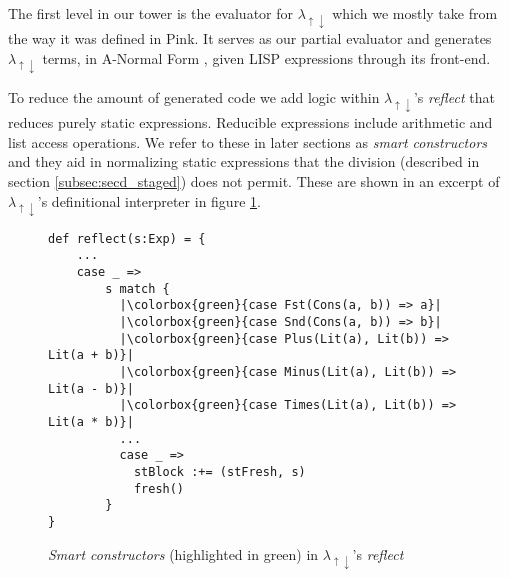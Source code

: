 \documentclass[a4paper,12pt,twoside,openright]{report}
\theoremstyle{definition}
\newcommand{\mslang}{$\lambda_{\uparrow\downarrow}$}
\begin{document}
The first level in our tower is the evaluator for \mslang{} which we mostly take from the way it was defined in Pink. It serves as our partial evaluator and generates \mslang{} terms, in A-Normal Form \cite{flanagan1993essence}, given LISP expressions through its front-end.

To reduce the amount of generated code we add logic within \mslang's \textit{reflect} that reduces purely static expressions. Reducible expressions include arithmetic and list access operations. We refer to these in later sections as \textit{smart constructors} and they aid in normalizing static expressions that the division (described in section \ref{subsec:secd_staged}) does not permit. These are shown in an excerpt of \mslang's definitional interpreter in figure \ref{lst:mslang_interp}.

\begin{figure}
    \centering
    \begin{verbatim}
def reflect(s:Exp) = {
    ...
    case _ =>
        s match {
          |\colorbox{green}{case Fst(Cons(a, b)) => a}|
          |\colorbox{green}{case Snd(Cons(a, b)) => b}|
          |\colorbox{green}{case Plus(Lit(a), Lit(b)) => Lit(a + b)}|
          |\colorbox{green}{case Minus(Lit(a), Lit(b)) => Lit(a - b)}|
          |\colorbox{green}{case Times(Lit(a), Lit(b)) => Lit(a * b)}|
          ...
          case _ =>
            stBlock :+= (stFresh, s)
            fresh()
        }
}
    \end{verbatim}
    \caption{\textit{Smart constructors} (highlighted in green) in \mslang's \textit{reflect}}
    \label{lst:mslang_interp}
\end{figure}

\end{document}
